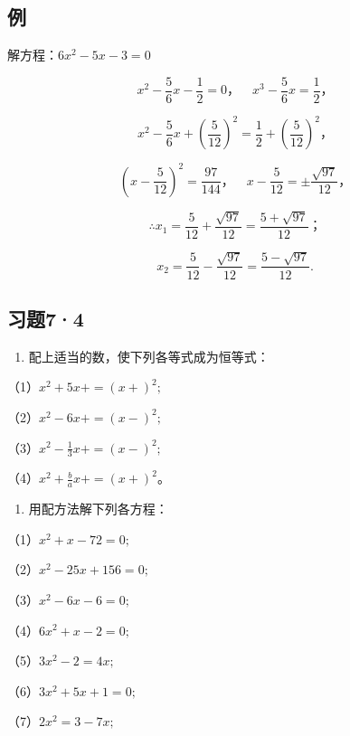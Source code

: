 \subsection{例}

解方程：\(6x^{2}-5x-3=0\)


\[
x ^ {2} - \frac{5}{6} x - \frac{1}{2} = 0\text{，} \quad x ^ {3} - \frac{5}{6} x = \frac{1}{2}\text{，}
\]

\[
x ^ {2} - \frac{5}{6} x + \left(\frac{5}{12}\right) ^ {2} = \frac{1}{2} + \left(\frac{5}{12}\right) ^ {2}\text{，}
\]

\[
\left(x - \frac{5}{12}\right) ^ {2} = \frac{97}{144}\text{，} \quad x - \frac{5}{12} = \pm \frac{\sqrt {97}}{12}\text{，}
\]

\[
\therefore x _ {1} = \frac{5}{12} + \frac{\sqrt {97}}{12} = \frac{5 + \sqrt {97}}{12}\text{；}
\]

\[
x _ {2} = \frac{5}{12} - \frac{\sqrt {97}}{12} = \frac{5 - \sqrt {97}}{12}.
\]

\subsection{习题7·4}

\begin{enumerate}
\item
  配上适当的数，使下列各等式成为恒等式：
\end{enumerate}

（1）\(x^{2} + 5x + = (x + )^{2};\)

（2）\(x^{2} - 6x + = (x - )^{2};\)

（3）\(x^{2} - \frac{1}{3} x + = (x - )^{2};\)

（4）\(x^{2} + \frac{b}{a} x + = (x + )^{2}\)。

\begin{enumerate}[start=2]
\item
  用配方法解下列各方程：
\end{enumerate}

（1）\(x^{2} + x - 72 = 0;\)

（2）\(x^{2} - 25x + 156 = 0;\)

（3）\(x^{2} - 6x - 6 = 0;\)

（4）\(6x^{2} + x - 2 = 0;\)

（5）\(3x^{2} - 2 = 4x;\)

（6）\(3x^{2} + 5x + 1 = 0;\)

（7）\(2x^{2} = 3 - 7x;\)

